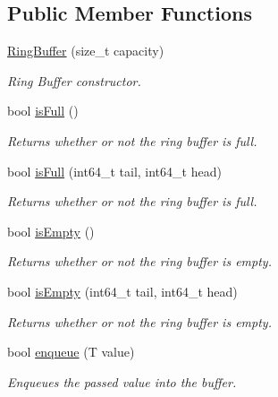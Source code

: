 \subsection*{Public Member Functions}
\begin{DoxyCompactItemize}
\item 
\hyperlink{classtervel_1_1containers_1_1wf_1_1_ring_buffer_aa273f827eb69a6d148d1a3449d8a18ec}{Ring\+Buffer} (size\+\_\+t capacity)
\begin{DoxyCompactList}\small\item\em Ring Buffer constructor. \end{DoxyCompactList}\item 
bool \hyperlink{classtervel_1_1containers_1_1wf_1_1_ring_buffer_a7079b1f92598181c4ef7c179d1eb2773}{is\+Full} ()
\begin{DoxyCompactList}\small\item\em Returns whether or not the ring buffer is full. \end{DoxyCompactList}\item 
bool \hyperlink{classtervel_1_1containers_1_1wf_1_1_ring_buffer_a5af5dec4a0f9b17f419189352ff94826}{is\+Full} (int64\+\_\+t tail, int64\+\_\+t head)
\begin{DoxyCompactList}\small\item\em Returns whether or not the ring buffer is full. \end{DoxyCompactList}\item 
bool \hyperlink{classtervel_1_1containers_1_1wf_1_1_ring_buffer_a4e01d955bd0bc4b75ad1e79fe5c3b1c7}{is\+Empty} ()
\begin{DoxyCompactList}\small\item\em Returns whether or not the ring buffer is empty. \end{DoxyCompactList}\item 
bool \hyperlink{classtervel_1_1containers_1_1wf_1_1_ring_buffer_a537c3fd338a5d277f7d20d8ca52c96ac}{is\+Empty} (int64\+\_\+t tail, int64\+\_\+t head)
\begin{DoxyCompactList}\small\item\em Returns whether or not the ring buffer is empty. \end{DoxyCompactList}\item 
bool \hyperlink{classtervel_1_1containers_1_1wf_1_1_ring_buffer_a9a077f004d6e7844d21fbe6ca9c259e9}{enqueue} (T value)
\begin{DoxyCompactList}\small\item\em Enqueues the passed value into the buffer. \end{DoxyCompactList}\item 

\end{DoxyCompactItemize}
